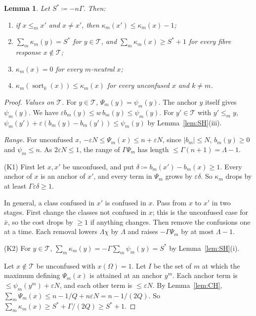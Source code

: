 \documentclass[11pt]{article}
\newtheorem{lemma}[theorem]{Lemma}
\theoremstyle{definition}
\theoremstyle{remark}
\newcommand{\T}{\mathcal T}
\begin{document}
\begin{lemma}\label{lem:cost}
Let $S^\ast\coloneqq-n\Gamma$. Then:
\begin{enumerate}[label=\textup{(K\arabic*)}]
\item if $x\le_mx'$ and $x\neq x'$, then $\kappa_m(x')\le\kappa_m(x)-1$;
\item $\sum_m\kappa_m(y)=S^\ast$ for $y\in\T$, and $\sum_m\kappa_m(x)\ge S^\ast+1$ for every fibre response $x\notin\T$;
\item $\kappa_m(x)=0$ for every $m$-neutral $x$;
\item $\kappa_m(\operatorname{sort}_k(x))\le\kappa_m(x)$ for every unconfused $x$ and $k\neq m$.
\end{enumerate}
\end{lemma}
\begin{proof}
\emph{Values on $\T$.} For $y\in\T$, $\Psi_m(y)=\psi_m(y)$. The anchor $y$ itself gives $\psi_m(y)$. We have $\varepsilon b_m(y)\le w\,b_m(y)\le\psi_m(y)$. For $y'\in\T$ with $y'\le_my$, $\psi_m(y')+\varepsilon(b_m(y)-b_m(y'))\le\psi_m(y)$ by Lemma~\ref{lem:SH}(iii).

\emph{Range.} For unconfused $x$, $-\varepsilon N\le\Psi_m(x)\le n+\varepsilon N$, since $|b_m|\le N$, $b_m(y)\ge0$ and $\psi_m\le n$. As $2\varepsilon N\le1$, the range of $\Gamma\Psi_m$ has length $\le\Gamma(n+1)=\Lambda-1$.

(K1) First let $x,x'$ be unconfused, and put $\delta\coloneqq b_m(x')-b_m(x)\ge1$. Every anchor of $x$ is an anchor of $x'$, and every term in $\Psi_m$ grows by $\varepsilon\delta$. So $\kappa_m$ drops by at least $\Gamma\varepsilon\delta\ge1$.

In general, a class confused in $x'$ is confused in $x$. Pass from $x$ to $x'$ in two stages. First change the classes not confused in $x$; this is the unconfused case for $\bar x$, so the cost drops by $\ge1$ if anything changes. Then remove the confusions one at a time. Each removal lowers $\Lambda\chi$ by $\Lambda$ and raises $-\Gamma\Psi_m$ by at most $\Lambda-1$.

(K2) For $y\in\T$, $\sum_m\kappa_m(y)=-\Gamma\sum_m\psi_m(y)=S^\ast$ by Lemma~\ref{lem:SH}(i).

Let $x\notin\T$ be unconfused with $x(\Omega)=1$. Let $I$ be the set of $m$ at which the maximum defining $\Psi_m(x)$ is attained at an anchor $y^m$. Each anchor term is $\le\psi_m(y^m)+\varepsilon N$, and each other term is $\le\varepsilon N$. By Lemma~\ref{lem:CH}, $\sum_m\Psi_m(x)\le n-1/Q+n\varepsilon N=n-1/(2Q)$. So $\sum_m\kappa_m(x)\ge S^\ast+\Gamma/(2Q)\ge S^\ast+1$.


\end{proof}
\end{document}
